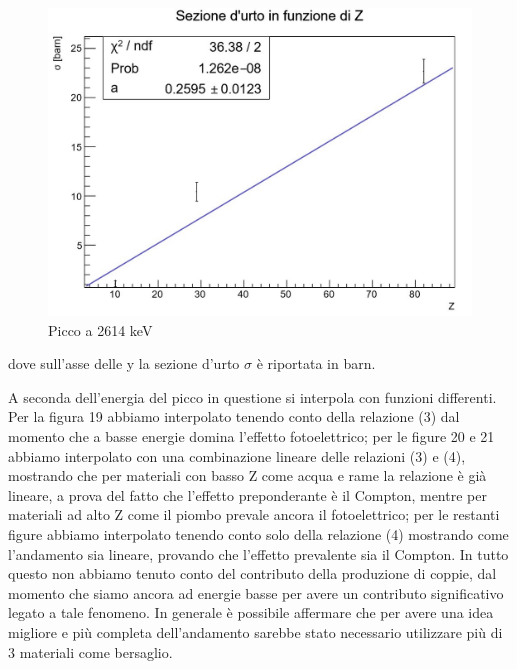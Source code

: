 \documentclass[a4paper,10pt]{article}
\begin{document}
\begin{figure}[H]
    \centering
    \includegraphics[scale=0.6]{grafici/picco2614}
    \caption{Picco a 2614 keV}
\end{figure}

\noindent dove sull'asse delle y la sezione d'urto $\sigma$ è riportata in barn.

\noindent A seconda dell'energia del picco in questione si interpola con funzioni differenti. Per la figura 19 abbiamo interpolato tenendo conto della relazione (3) dal momento che a basse energie domina l'effetto fotoelettrico; per le figure 20 e 21 abbiamo interpolato con una combinazione lineare delle relazioni (3) e (4), mostrando che per materiali con basso Z come acqua e rame la relazione \`e gi\`a lineare, a prova del fatto che l'effetto preponderante \`e il Compton, mentre per materiali ad alto Z come il piombo prevale ancora il fotoelettrico; per le restanti figure abbiamo interpolato tenendo conto solo della relazione (4) mostrando come l'andamento sia lineare, provando che l'effetto prevalente sia il Compton. In tutto questo non abbiamo tenuto conto del contributo della produzione di coppie, dal momento che siamo ancora ad energie basse per avere un contributo significativo legato a tale fenomeno. In generale \`e possibile affermare che per avere una idea migliore e pi\`u completa dell'andamento sarebbe stato necessario utilizzare pi\`u di 3 materiali come bersaglio. 
\end{document}
